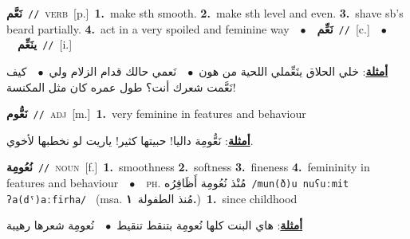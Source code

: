\documentclass[10pt,a4paper,twoside]{article} %
\begin{document}
\begin{multicols}{2}
{\setlength\topsep{0pt}\textbf{\foreignlanguage{arabic}{نَعَّم}}\ {\color{gray}\texttt{//}\color{black}}\ \textsc{verb}\ [p.]\ \textbf{1.}~make sth smooth.  \textbf{2.}~make sth level and even.  \textbf{3.}~shave sb's  beard partially.  \textbf{4.}~act in a very spoiled and feminine way\ \ $\bullet$\ \ \setlength\topsep{0pt}\textbf{\foreignlanguage{arabic}{نَعِّم}}\ {\color{gray}\texttt{//}\color{black}}\ [c.]\ \ $\bullet$\ \ \setlength\topsep{0pt}\textbf{\foreignlanguage{arabic}{ينَعِّم}}\ {\color{gray}\texttt{//}\color{black}}\ [i.]\  \begin{flushright}\color{gray}\foreignlanguage{arabic}{\textbf{\underline{\foreignlanguage{arabic}{أمثلة}}}: خلي الحلاق ينَعِّملي اللحية من هون\ $\bullet$\ \  نَعمي حالك قدام الزلام ولي\ $\bullet$\ \  كيف نَعَّمت شعرك أنت؟ طول عمره كان مثل المكنسة!}\end{flushright}\color{black}} \vspace{2mm}

{\setlength\topsep{0pt}\textbf{\foreignlanguage{arabic}{نَعُّوم}}\ {\color{gray}\texttt{//}\color{black}}\ \textsc{adj}\ [m.]\ \textbf{1.}~very feminine in features and behaviour\  \begin{flushright}\color{gray}\foreignlanguage{arabic}{\textbf{\underline{\foreignlanguage{arabic}{أمثلة}}}: نَعُّومِة داليا! حبيتها كثير! ياريت لو نخطبها لأخوي.}\end{flushright}\color{black}} \vspace{2mm}

{\setlength\topsep{0pt}\textbf{\foreignlanguage{arabic}{نُعُومِة}}\ {\color{gray}\texttt{//}\color{black}}\ \textsc{noun}\ [f.]\ \textbf{1.}~smoothness  \textbf{2.}~softness  \textbf{3.}~fineness  \textbf{4.}~femininity in features and behaviour\ \ $\bullet$\ \ \textsc{ph.} \color{gray} \foreignlanguage{arabic}{مُنْذ نُعُومِة أَظَافِرُه}\color{black}\ {\color{gray}\texttt{/{\sffamily mun(ð)u nuʕuːmit ʔa(dˤ)aːfirha}/}\color{black}}\ \color{gray} (msa. \foreignlanguage{arabic}{مُنذ الطفولة}~\foreignlanguage{arabic}{\textbf{١.}})\color{black}\ \textbf{1.}~since childhood\  \begin{flushright}\color{gray}\foreignlanguage{arabic}{\textbf{\underline{\foreignlanguage{arabic}{أمثلة}}}: هاي البنت كلها نُعومِة بتنقط تنقيط\ $\bullet$\ \  نُعومِة شعرها رهيبة}\end{flushright}\color{black}} \vspace{2mm}


\end{multicols}
\end{document}
